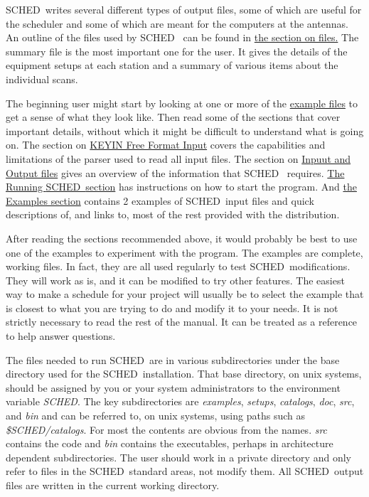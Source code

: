 \documentclass{report}
\newcommand{\schedb}{{\sc SCHED~}}
\begin{document}
\schedb writes several different types of output files, some of which
are useful for the scheduler and some of which are meant for the
computers at the antennas.  An outline of the files used by \schedb
can be found in
\hyperref[SEC:FILES]{the section on files.}
The summary file is the most important one for
the user.  It gives the details of the equipment setups at each
station and a summary of various items about the individual scans.

The beginning user might start by looking at one or more of the
{\hyperref[SEC:EXAMPLES]{example files}} to get a sense of what they look
like.  Then read some of the sections that cover important details,
without which it might be difficult to understand what is going on.
The section on
\hyperref[SEC:KEYIN]{KEYIN Free Format Input}
covers the capabilities and limitations
of the parser used to read all input files.  The section on
\hyperref[SEC:FILES]{Inpuut and Output files}
gives an overview of the information that \schedb
requires.
\hyperref[SEC:RUNSCHED]{The Running \schedb section}
has instructions on how to start the program.  And
\hyperref[SEC:EXAMPLES]{the Examples section}
contains 2 examples of \schedb input files and quick descriptions of,
and links to, most of the rest provided with the distribution.

After reading the sections recommended above, it would probably be
best to use one of the examples to experiment with the program.  The
examples are complete, working files.  In fact, they are all used
regularly to test \schedb modifications.  They will work as is, and
it can be modified to try other features.  The easiest way to make a
schedule for your project will usually be to select the example that
is closest to what you are trying to do and modify it to your needs.
It is not strictly necessary to read the rest of the manual.  It can
be treated as a reference to help answer questions.

The files needed to run \schedb are in various subdirectories under
the base directory used for the \schedb installation.  That base
directory, on unix systems, should be assigned by you or your system
administrators to the environment variable {\sl SCHED}.  The key
subdirectories are {\sl examples}, {\sl setups}, {\sl catalogs}, {\sl
doc}, {\sl src}, and {\sl bin} and can be referred to, on unix systems,
using paths such as {\sl \$SCHED/catalogs}.  For most the contents are
obvious from the names.  {\sl src} contains the code and {\sl bin}
contains the executables, perhaps in architecture dependent
subdirectories.  The user should work in a private directory and only
refer to files in the \schedb standard areas, not modify them.  All
\schedb output files are written in the current working directory.
\end{document}
